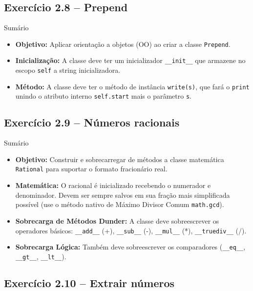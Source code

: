 \documentclass[11pt,a4paper]{article}
\begin{document}
\subsection*{Exercício 2.8 -- Prepend}

\begin{exercicio}{Sumário}
\begin{itemize}
    \item \textbf{Objetivo:} Aplicar orientação a objetos (OO) ao criar a classe \texttt{Prepend}.
    \item \textbf{Inicialização:} A classe deve ter um inicializador \texttt{\_\_init\_\_} que armazene no escopo \texttt{self} a string inicializadora.
    \item \textbf{Método:} A classe deve ter o método de instância \texttt{write(s)}, que fará o \texttt{print} unindo o atributo interno \texttt{self.start} mais o parâmetro \texttt{s}.
\end{itemize}
\end{exercicio}


\subsection*{Exercício 2.9 -- Números racionais}

\begin{exercicio}{Sumário}
\begin{itemize}
    \item \textbf{Objetivo:} Construir e sobrecarregar de métodos a classe matemática \texttt{Rational} para suportar o formato fracionário real.
    \item \textbf{Matemática:} O racional é inicializado recebendo o numerador e denominador. Devem ser sempre salvos em sua fração mais simplificada possível (use o método nativo de Máximo Divisor Comum \texttt{math.gcd}).
    \item \textbf{Sobrecarga de Métodos Dunder:} A classe deve sobreescrever os operadores básicos:  \texttt{\_\_add\_\_} (+), \texttt{\_\_sub\_\_} (-), \texttt{\_\_mul\_\_} (*), \texttt{\_\_truediv\_\_} (/). 
    \item \textbf{Sobrecarga Lógica:} Também deve sobreescrever os comparadores (\texttt{\_\_eq\_\_}, \texttt{\_\_gt\_\_}, \texttt{\_\_lt\_\_}).
\end{itemize}
\end{exercicio}


\subsection*{Exercício 2.10 -- Extrair números}
\end{document}
